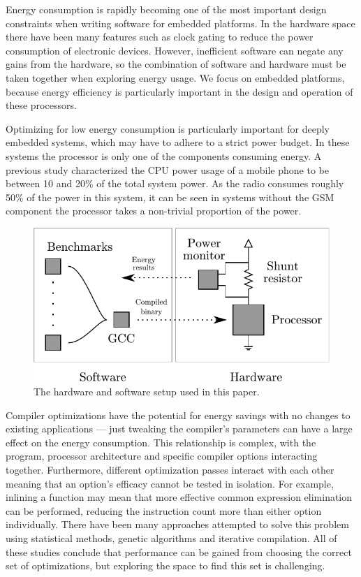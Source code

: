 \documentclass[twocolumn]{article}
\let\oldcaption\caption
\renewcommand{\caption}[1]{\oldcaption{\textup{#1}}}
\begin{document}
Energy consumption is rapidly becoming one of the most important design constraints when writing software for embedded platforms. In the hardware space there have been many features such as clock gating to reduce the power consumption of electronic devices. However, inefficient software can negate any gains from the hardware, so the combination of software and hardware must be taken together when exploring energy usage. We focus on embedded platforms, because energy efficiency is particularly important in the design and operation of these processors.

Optimizing for low energy consumption is particularly important for deeply embedded systems, which may have to adhere to a strict power budget. In these systems the processor is only one of the components consuming energy. A previous study characterized the CPU power usage of a mobile phone to be between 10 and 20\% of the total system power\cite{SmartPhonePower}. As the radio consumes roughly 50\% of the power in this system, it can be seen in systems without the GSM component the processor takes a non-trivial proportion of the power.

\begin{figure}[b!]
	\includegraphics[width=\linewidth]{diagram.pdf}
	\caption{The hardware and software setup used in this paper.}
	\label{Fig:setup}
\end{figure}

Compiler optimizations have the potential for energy savings with no changes to existing applications --- just tweaking the compiler's parameters can have a large effect on the energy consumption. This relationship is complex, with the program, processor architecture and specific compiler options interacting together. Furthermore, different optimization passes interact with each other meaning that an option's efficacy cannot be tested in isolation. For example, inlining a function may mean that more effective common expression elimination can be performed, reducing the instruction count more than either option individually. There have been many approaches attempted to solve this problem using statistical methods\cite{Haneda2005}, genetic algorithms\cite{Lin2008} and iterative compilation\cite{Kisuki1999}. All of these studies conclude that performance can be gained from choosing the correct set of optimizations, but exploring the space to find this set is challenging.
\end{document}
